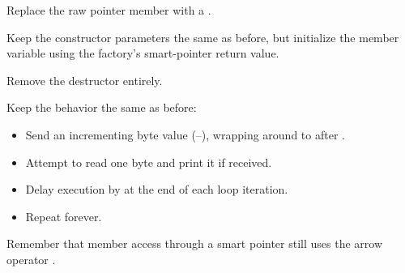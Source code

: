Replace the raw pointer member  with a .

Keep the constructor parameters the same as before, but initialize the member variable using the
factory's smart-pointer return value.

Remove the destructor entirely.

Keep the behavior the same as before:
\begin{itemize}
  \item Send an incrementing byte value (--), wrapping around to  after
    .
  \item Attempt to read one byte and print it if received.
  \item Delay execution by  at the end of each loop iteration.
  \item Repeat forever.
\end{itemize}
Remember that member access through a smart pointer still uses the arrow operator \code{->}.
